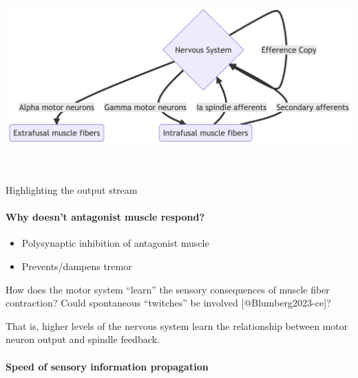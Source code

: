 \documentclass[
  letterpaper,
  DIV=11,
  numbers=noendperiod]{scrartcl}
\let\oldparagraph\paragraph
\renewcommand{\paragraph}[1]{\oldparagraph{#1}\mbox{}}
\providecommand{\tightlist}{%
  \setlength{\itemsep}{0pt}\setlength{\parskip}{0pt}}\usepackage{longtable,booktabs,array}
\begin{document}
\includegraphics[width=7.18in,height=2.9in]{action_files/figure-latex/mermaid-figure-2.png}

Highlighting the output stream

\paragraph{Why doesn't antagonist muscle
respond?}\label{why-doesnt-antagonist-muscle-respond}

\begin{itemize}
\tightlist
\item
  Polysynaptic inhibition of antagonist muscle
\item
  Prevents/dampens tremor
\end{itemize}

\begin{tcolorbox}[enhanced jigsaw, leftrule=.75mm, opacityback=0, colbacktitle=quarto-callout-note-color!10!white, rightrule=.15mm, arc=.35mm, coltitle=black, breakable, colframe=quarto-callout-note-color-frame, toprule=.15mm, bottomrule=.15mm, opacitybacktitle=0.6, bottomtitle=1mm, titlerule=0mm, toptitle=1mm, colback=white, left=2mm, title=\textcolor{quarto-callout-note-color}{\faInfo}\hspace{0.5em}{Note}]

How does the motor system ``learn'' the sensory consequences of muscle
fiber contraction? Could spontaneous ``twitches'' be involved
{[}@Blumberg2023-ce{]}?

That is, higher levels of the nervous system learn the relationship
between motor neuron output and spindle feedback.

\end{tcolorbox}

\paragraph{Speed of sensory information
propagation}\label{speed-of-sensory-information-propagation}
\end{document}
